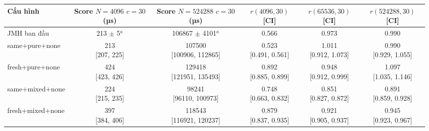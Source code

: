 \setlength{\tabcolsep}{3pt}
\begin{tabular}{lccccc}
\toprule
Cấu hình & \makecell{{Score $N{=}4096$} \\ {$c{=}30$ (µs)}} & \makecell{{Score $N{=}524288$} \\ {$c{=}30$ (µs)}} & \makecell{{$r(4096, 30)$} \\ {[CI]}} & \makecell{{$r(65536, 30)$} \\ {[CI]}} & \makecell{{$r(524288, 30)$} \\ {[CI]}} \\
\midrule
JMH ban đầu & 213 $\pm$ 5$^{a}$ & 106867 $\pm$ 4101$^{a}$ & 0.566 & 0.973 & 0.990 \\
same+pure+none & \makecell{213 \\ {[207, 225]}} & \makecell{107500 \\ {[100906, 112865]}} & \makecell{0.523 \\ {[0.491, 0.561]}} & \makecell{1.011 \\ {[0.912, 1.073]}} & \makecell{0.990 \\ {[0.929, 1.055]}} \\
fresh+pure+none & \makecell{424 \\ {[423, 426]}} & \makecell{129418 \\ {[121951, 135493]}} & \makecell{0.892 \\ {[0.885, 0.899]}} & \makecell{0.948 \\ {[0.912, 0.999]}} & \makecell{1.097 \\ {[1.035, 1.146]}} \\
same+mixed+none & \makecell{224 \\ {[215, 235]}} & \makecell{98241 \\ {[96110, 100973]}} & \makecell{0.748 \\ {[0.663, 0.832]}} & \makecell{0.851 \\ {[0.827, 0.872]}} & \makecell{0.891 \\ {[0.859, 0.928]}} \\
fresh+mixed+none & \makecell{397 \\ {[384, 406]}} & \makecell{118543 \\ {[116921, 120237]}} & \makecell{0.879 \\ {[0.837, 0.935]}} & \makecell{0.921 \\ {[0.905, 0.937]}} & \makecell{0.945 \\ {[0.923, 0.967]}} \\

\end{tabular}
